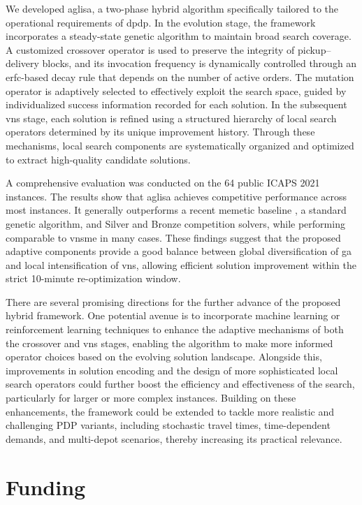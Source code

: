 \documentclass[]{interact}
\begin{document}
We developed \gls{aglisa}, a two-phase hybrid algorithm specifically tailored to the operational requirements of \gls{dpdp}. In the evolution stage, the framework incorporates a steady-state genetic algorithm to maintain broad search coverage. A customized crossover operator is used to preserve the integrity of pickup–delivery blocks, and its invocation frequency is dynamically controlled through an erfc-based decay rule that depends on the number of active orders. The mutation operator is adaptively selected to effectively exploit the search space, guided by individualized success information recorded for each solution. In the subsequent \gls{vns} stage, each solution is refined using a structured hierarchy of local search operators determined by its unique improvement history. Through these mechanisms, local search components are systematically organized and optimized to extract high-quality candidate solutions.

A comprehensive evaluation was conducted on the 64 public ICAPS 2021 instances. The results show that \gls{aglisa} achieves competitive performance across most instances. It generally outperforms a recent memetic baseline \cite{zhou2024memetic}, a standard genetic algorithm, and Silver and Bronze competition solvers, while performing comparable to \gls{vnsme} \cite{cai2022variable} in many cases. These findings suggest that the proposed adaptive components provide a good balance between global diversification of \gls{ga} and local intensification of \gls{vns}, allowing efficient solution improvement within the strict 10-minute re-optimization window.

There are several promising directions for the further advance of the proposed hybrid framework. One potential avenue is to incorporate machine learning or reinforcement learning techniques to enhance the adaptive mechanisms of both the crossover and \gls{vns} stages, enabling the algorithm to make more informed operator choices based on the evolving solution landscape. Alongside this, improvements in solution encoding and the design of more sophisticated local search operators could further boost the efficiency and effectiveness of the search, particularly for larger or more complex instances. Building on these enhancements, the framework could be extended to tackle more realistic and challenging PDP variants, including stochastic travel times, time-dependent demands, and multi-depot scenarios, thereby increasing its practical relevance.
 \section*{Funding}
\end{document}
